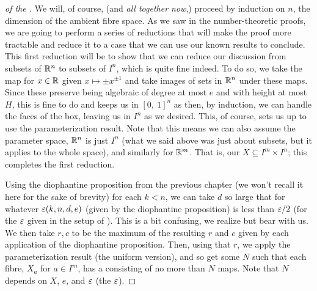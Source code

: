 \begin{proof}[of the \pwT]
  We will, of course, (and \emph{all together now},) proceed by induction on $n$, the dimension of the ambient fibre space. As we saw in the number-theoretic proofs, we are going to perform a series of reductions that will make the proof more tractable and reduce it to a case that we can use our known results to conclude. This first reduction will be to show that we can reduce our discussion from subsets of $\mathbb{R}^n$ to subsets of $I^n$, which is quite fine indeed. To do so, we take the map for $x \in \mathbb{R}$ given $x \mapsto \pm x^{\pm 1}$ and take images of sets in $\mathbb{R}^n$ under these maps. Since these preserve being algebraic of degree at most $e$ and with height at most $H$, this is fine to do and keeps us in $[0,  \ 1]^n$ as then, by induction, we can handle the faces of the box, leaving us in $I^n$ as we desired. This, of course, sets us up to use the parameterization result. Note that this means we can also assume the parameter space, $\mathbb{R}^n$ is just $I^n$ (what we said above was just about subsets, but it applies to the whole space), and similarly for $\mathbb{R}^m$. That is, our $X \subseteq I^m \times I^n$; this completes the first reduction.
  
  Using the diophantine proposition from the previous chapter (we won't recall it here for the sake of brevity) for each $k < n$, we can take $d$ so large that for whatever $\varepsilon (k, n, d, e)$ (given by the diophantine proposition) is less than $\varepsilon / 2$ (for the $\varepsilon$ given in the setup of \pw). This is a bit confusing, we realize but bear with us. We then take $r, c$ to be the maximum of the resulting $r$ and $c$ given by each application of the diophantine proposition. Then, using that $r$, we apply the parameterization result (the uniform version), and so get some $N$ such that each fibre, $X_a$ for $a \in I^m$, has a \cellrparam consisting of no more than $N$ maps. Note that $N$ depends on $X$, $e$, and $\varepsilon$ (the \pw $\varepsilon$).
  

\end{proof}
